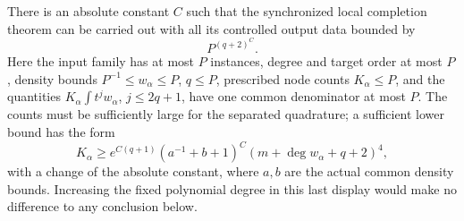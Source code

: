 \documentclass[11pt]{article}
\begin{document}
\begin{lemma}\label{local}
There is an absolute constant $C$ such that the synchronized local
completion theorem can be carried out with all its controlled output
data bounded by
\[
 P^{(q+2)^C}.
\]
Here the input family has at most $P$ instances, degree and target
order at most $P$, density bounds $P^{-1}\le w_\alpha\le P$,
$q\le P$, prescribed node counts $K_\alpha\le P$, and the quantities
$K_\alpha\int t^j w_\alpha$, $j\le2q+1$, have one common denominator
at most $P$. The counts must be sufficiently large for the separated
quadrature; a sufficient lower bound has the form
\[
 K_\alpha\ge e^{C(q+1)}
    (a^{-1}+b+1)^C(m+\deg w_\alpha+q+2)^4,
\]
with a change of the absolute constant, where $a,b$ are the actual
common density bounds. Increasing the fixed polynomial degree in this
last display would make no difference to any conclusion below.
\end{lemma}
\end{document}
